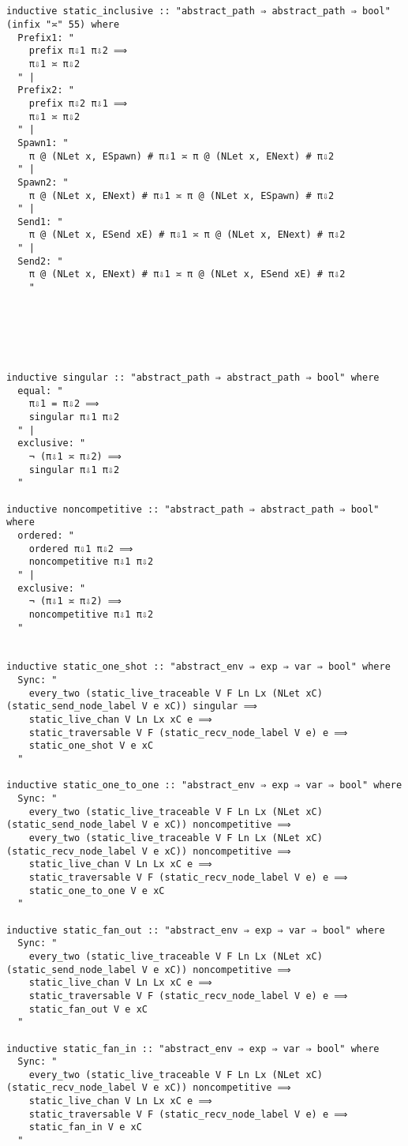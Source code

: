 \documentclass{article}
\begin{document}
\begin{lstlisting}[style=codestyle1, escapechar=\%]

  
inductive static_inclusive :: "abstract_path ⇒ abstract_path ⇒ bool" (infix "≍" 55) where
  Prefix1: "
    prefix π⇩1 π⇩2 ⟹
    π⇩1 ≍ π⇩2
  " |
  Prefix2: "
    prefix π⇩2 π⇩1 ⟹
    π⇩1 ≍ π⇩2
  " |
  Spawn1: "
    π @ (NLet x, ESpawn) # π⇩1 ≍ π @ (NLet x, ENext) # π⇩2
  " |
  Spawn2: "
    π @ (NLet x, ENext) # π⇩1 ≍ π @ (NLet x, ESpawn) # π⇩2
  " |
  Send1: "
    π @ (NLet x, ESend xE) # π⇩1 ≍ π @ (NLet x, ENext) # π⇩2
  " |
  Send2: "
    π @ (NLet x, ENext) # π⇩1 ≍ π @ (NLet x, ESend xE) # π⇩2
    "

    
  \end{lstlisting}



\begin{lstlisting}[style=codestyle1, escapechar=\%]


  
inductive singular :: "abstract_path ⇒ abstract_path ⇒ bool" where
  equal: "
    π⇩1 = π⇩2 ⟹ 
    singular π⇩1 π⇩2
  " |
  exclusive: "
    ¬ (π⇩1 ≍ π⇩2) ⟹ 
    singular π⇩1 π⇩2
  "

inductive noncompetitive :: "abstract_path ⇒ abstract_path ⇒ bool" where
  ordered: "
    ordered π⇩1 π⇩2 ⟹ 
    noncompetitive π⇩1 π⇩2
  " |
  exclusive: "
    ¬ (π⇩1 ≍ π⇩2) ⟹ 
    noncompetitive π⇩1 π⇩2
  "


inductive static_one_shot :: "abstract_env ⇒ exp ⇒ var ⇒ bool" where
  Sync: "
    every_two (static_live_traceable V F Ln Lx (NLet xC) (static_send_node_label V e xC)) singular ⟹
    static_live_chan V Ln Lx xC e ⟹
    static_traversable V F (static_recv_node_label V e) e ⟹
    static_one_shot V e xC 
  "

inductive static_one_to_one :: "abstract_env ⇒ exp ⇒ var ⇒ bool" where
  Sync: "
    every_two (static_live_traceable V F Ln Lx (NLet xC) (static_send_node_label V e xC)) noncompetitive ⟹
    every_two (static_live_traceable V F Ln Lx (NLet xC) (static_recv_node_label V e xC)) noncompetitive ⟹
    static_live_chan V Ln Lx xC e ⟹
    static_traversable V F (static_recv_node_label V e) e ⟹
    static_one_to_one V e xC 
  "

inductive static_fan_out :: "abstract_env ⇒ exp ⇒ var ⇒ bool" where
  Sync: "
    every_two (static_live_traceable V F Ln Lx (NLet xC) (static_send_node_label V e xC)) noncompetitive ⟹
    static_live_chan V Ln Lx xC e ⟹
    static_traversable V F (static_recv_node_label V e) e ⟹
    static_fan_out V e xC 
  "

inductive static_fan_in :: "abstract_env ⇒ exp ⇒ var ⇒ bool" where
  Sync: "
    every_two (static_live_traceable V F Ln Lx (NLet xC) (static_recv_node_label V e xC)) noncompetitive ⟹
    static_live_chan V Ln Lx xC e ⟹
    static_traversable V F (static_recv_node_label V e) e ⟹
    static_fan_in V e xC 
  "

    
  \end{lstlisting}
\end{document}
